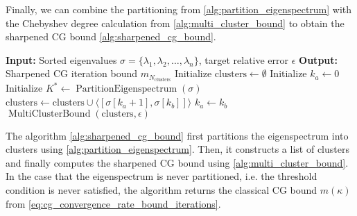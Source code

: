 Finally, we can combine the partitioning from \cref{alg:partition_eigenspectrum} with the Chebyshev degree calculation from \cref{alg:multi_cluster_bound} to obtain the sharpened CG bound \cref{alg:sharpened_cg_bound}.
\begin{algorithm}[H]
    \caption{$\operatorname{SharpenedCGBound}(\sigma, \epsilon)$}
    \begin{algorithmic}[1]
        \State \textbf{Input:} Sorted eigenvalues $\sigma = \{\lambda_1, \lambda_2, \ldots, \lambda_n\}$, target relative error $\epsilon$
        \State \textbf{Output:} Sharpened CG iteration bound $m_{N_{\text{clusters}}}$
        \State Initialize $\text{clusters} \gets \emptyset$
        \State Initialize $k_a \gets 0$
        \State Initialize $K^* \gets \operatorname{PartitionEigenspectrum}(\sigma)$
            \State $\text{clusters} \gets \text{clusters} \cup \langle[\sigma[k_a + 1], \sigma[k_b]]\rangle$
            \State $k_a \gets k_b$
        \EndFor
        \State \Return $\operatorname{MultiClusterBound}(\text{clusters}, \epsilon)$
    \end{algorithmic}
    \label{alg:sharpened_cg_bound}
\end{algorithm}
The algorithm \cref{alg:sharpened_cg_bound} first partitions the eigenspectrum into clusters using \cref{alg:partition_eigenspectrum}. Then, it constructs a list of clusters and finally computes the sharpened CG bound using \cref{alg:multi_cluster_bound}. In the case that the eigenspectrum is never partitioned, i.e. the threshold condition is never satisfied, the algorithm returns the classical CG bound $m(\kappa)$ from \cref{eq:cg_convergence_rate_bound_iterations}.